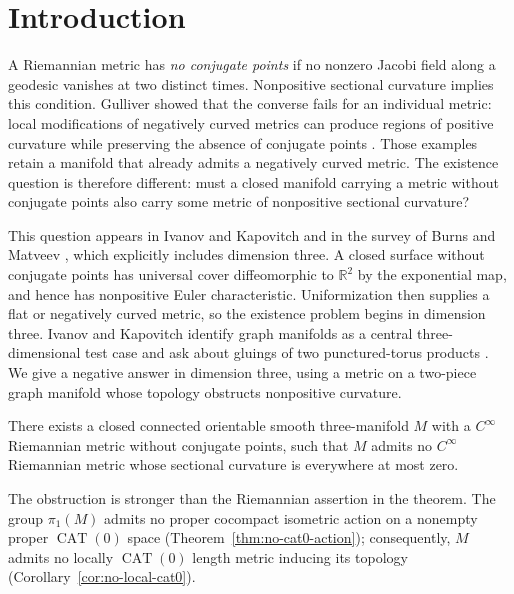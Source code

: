 \section{Introduction}

A Riemannian metric has \emph{no conjugate points} if no nonzero Jacobi
field along a geodesic vanishes at two distinct times. Nonpositive
sectional curvature implies this condition. Gulliver showed that the
converse fails for an individual metric: local modifications of negatively
curved metrics can produce regions of positive curvature while preserving
the absence of conjugate points \cite[Section~3]{Gulliver1975}. Those
examples retain a manifold that already admits a negatively curved
metric. The existence question is therefore different: must a closed
manifold carrying a metric without conjugate points also carry some
metric of nonpositive sectional curvature?

This question appears in Ivanov and Kapovitch
\cite[Questions~1.1 and~8.1]{IvanovKapovitch2014} and in the survey of
Burns and Matveev \cite[Question~4.1.2]{BurnsMatveev2021}, which explicitly
includes dimension three. A closed surface without conjugate points
has universal cover diffeomorphic to $\mathbb R^2$ by the exponential
map, and hence has nonpositive Euler characteristic. Uniformization
then supplies a flat or negatively curved metric, so the existence
problem begins in dimension three. Ivanov and Kapovitch identify graph manifolds
as a central three-dimensional test case and ask about gluings of two
punctured-torus products \cite[Section~8]{IvanovKapovitch2014}.
We give a negative answer in dimension three, using a metric on a
two-piece graph manifold whose topology obstructs nonpositive curvature.

\begin{theorem}\label{thm:main}
There exists a closed connected orientable smooth three-manifold $M$ with a $C^\infty$ Riemannian metric without conjugate points, such that $M$ admits no $C^\infty$ Riemannian metric whose sectional curvature is everywhere at most zero.
\end{theorem}

The obstruction is stronger than the Riemannian assertion in the theorem.
The group $\pi_1(M)$ admits no proper cocompact isometric action on a
nonempty proper $\operatorname{CAT}(0)$ space
(Theorem~\ref{thm:no-cat0-action}); consequently, $M$ admits no locally
$\operatorname{CAT}(0)$ length metric inducing its topology
(Corollary~\ref{cor:no-local-cat0}).


